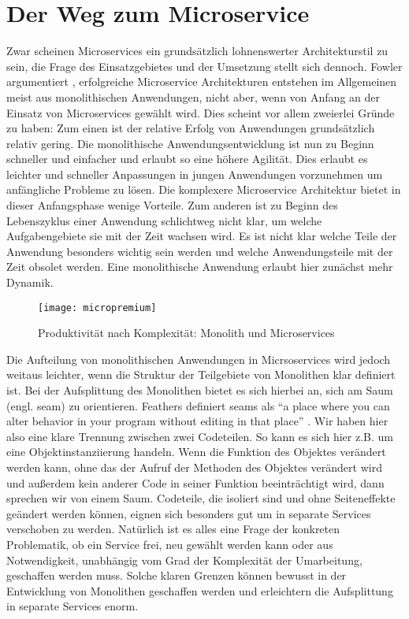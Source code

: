\section{Der Weg zum Microservice}
Zwar scheinen Microservices ein grundsätzlich lohnenswerter Architekturstil zu sein, die Frage des Einsatzgebietes und der Umsetzung stellt sich dennoch. Fowler argumentiert \cite[][]{fowler:monolithfirst}, erfolgreiche Microservice Architekturen entstehen im Allgemeinen meist aus monolithischen Anwendungen, nicht aber, wenn von Anfang an der Einsatz von Microservices gewählt wird. Dies scheint vor allem zweierlei Gründe zu haben: Zum einen ist der relative Erfolg von Anwendungen grundsätzlich relativ gering. Die monolithische Anwendungsentwicklung ist nun zu Beginn schneller und einfacher und erlaubt so eine höhere Agilität. Dies erlaubt es leichter und schneller Anpassungen in jungen Anwendungen vorzunehmen um anfängliche Probleme zu lösen. Die komplexere Microservice Architektur bietet in dieser Anfangsphase wenige Vorteile. Zum anderen ist zu Beginn des Lebenszyklus einer Anwendung schlichtweg nicht klar, um welche Aufgabengebiete sie mit der Zeit wachsen wird. Es ist nicht klar welche Teile der Anwendung besonders wichtig sein werden und welche Anwendungsteile mit der Zeit obsolet werden. Eine monolithische Anwendung erlaubt hier zunächst mehr Dynamik.

\begin{figure}[!ht]
    \caption{Produktivität nach Komplexität: Monolith und Microservices \cite{fowler:micropremium}}
    \centering
    \label{fig:micropremium}
    \texttt{[image: micropremium]}
\end{figure}

Die Aufteilung von monolithischen Anwendungen in Micrsoservices wird jedoch weitaus leichter, wenn die Struktur der Teilgebiete von Monolithen klar definiert ist. Bei der Aufsplittung des Monolithen bietet es sich hierbei an, sich am Saum (engl. seam) zu orientieren. Feathers definiert seams als ``a place where you can alter behavior in your program without editing in that place'' \cite[][Seite 29]{feathers2004working}. Wir haben hier also eine klare Trennung zwischen zwei Codeteilen. So kann es sich hier z.B. um eine Objektinstanziierung handeln. Wenn die Funktion des Objektes verändert werden kann, ohne das der Aufruf der Methoden des Objektes verändert wird und außerdem kein anderer Code in seiner Funktion beeinträchtigt wird, dann sprechen wir von einem Saum. Codeteile, die isoliert sind und ohne Seiteneffekte geändert werden können, eignen sich besonders gut um in separate Services verschoben zu werden. Natürlich ist es alles eine Frage der konkreten Problematik, ob ein Service frei, neu gewählt werden kann oder aus Notwendigkeit, unabhängig vom Grad der Komplexität der Umarbeitung, geschaffen werden muss. Solche klaren Grenzen können bewusst in der Entwicklung von Monolithen geschaffen werden und erleichtern die Aufsplittung in separate Services enorm.

